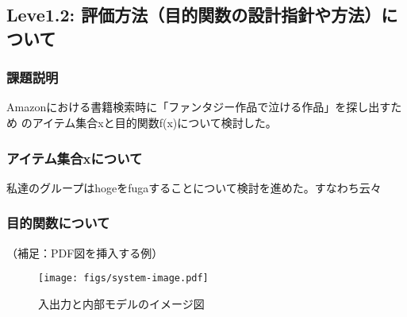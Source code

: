 \subsection{Leve1.2: 評価方法（目的関数の設計指針や方法）について}
\subsubsection{課題説明}
Amazonにおける書籍検索時に「ファンタジー作品で泣ける作品」を探し出すため
のアイテム集合xと目的関数f(x)について検討した。

\subsubsection{アイテム集合xについて}
私達のグループはhogeをfugaすることについて検討を進めた。すなわち云々

\subsubsection{目的関数について}

（補足：PDF図を挿入する例）

\begin{figure}[h]
 \begin{center}
  \texttt{[image: figs/system-image.pdf]}
  \caption{入出力と内部モデルのイメージ図}
 \end{center}
\end{figure}

